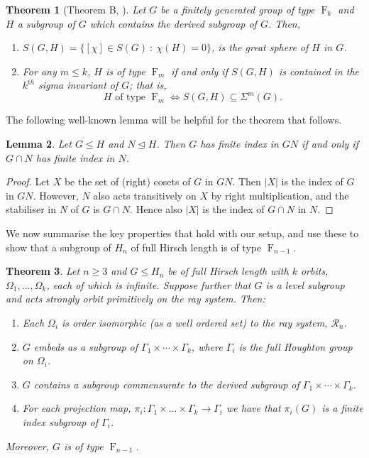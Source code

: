 \documentclass[11pt,a4paper]{amsart}
\newtheorem{theorem}{Theorem}[section]
\newtheorem{lemma}[theorem]{Lemma}
\theoremstyle{definition}
\theoremstyle{remark}
\newcommand{\Ra}{\mathcal{R}}
\newcommand{\FFF}{\operatorname{F}}
\begin{document}
\begin{theorem}[Theorem B, \cite{BNSdefinitions}]
\label{thm:BNS}	 Let $G$ be a finitely generated group of type $\FFF_k$ and $H$ a subgroup of $G$ which contains the derived subgroup of $G$. Then, 
\begin{enumerate}
	\item $S(G,H) = \{ [\chi] \in S(G) \ : \ \chi(H) = 0 \}$, is the great sphere of $H$ in $G$.
	\item For any $m \leq k$, $H$ is of type $\FFF_m$ if and only if $S(G,H)$ is contained in the $k^{th}$ sigma invariant of $G$; that is,
	$$
	H \text{ of type } \FFF_m \iff S(G,H) \subseteq \Sigma^m(G).
	$$
\end{enumerate}
\end{theorem}
The following well-known lemma will be helpful for the theorem that follows.
\begin{lemma}\label{lem:indexresult} Let $G\le H$ and $N\unlhd H$. Then $G$ has finite index in $GN$ if and only if $G\cap N$ has finite index in $N$.
\end{lemma}
\begin{proof} Let $X$ be the set of (right) cosets of $G$ in $GN$. Then $|X|$ is the index of $G$ in $GN$. However, $N$ also acts transitively on $X$ by right multiplication, and the stabiliser in $N$ of $G$ is $G \cap N$. Hence also $|X|$ is the index of $G \cap N$ in $N$.
\end{proof}
We now summarise the key properties that hold with our setup, and use these to show that a subgroup of $H_n$ of full Hirsch length is of type $\FFF_{n-1}$.
\begin{theorem}
	Let $n \geq 3$ and $G\le H_n$ be of full Hirsch length with $k$ orbits, $\Omega_1, \ldots, \Omega_k$, each of which is infinite. Suppose further that $G$ is a level subgroup and acts strongly orbit primitively on the ray system. Then: 
	\begin{enumerate}
		\item Each $\Omega_i$ is order isomorphic (as a well ordered set) to the ray system, $\Ra_n$.
		\item $G$ embeds as a subgroup of $\Gamma_1 \times \cdots \times\Gamma_k$, where $\Gamma_i$ is the full Houghton group on $\Omega_i$. 
		\item $G$ contains a subgroup commensurate to the derived subgroup of  $\Gamma_1 \times \cdots\times \Gamma_k$.
		\item For each projection map, $\pi_i: \Gamma_1 \times \ldots\times \Gamma_k \to \Gamma_i$ we have that $\pi_i(G)$ is a finite index subgroup of $\Gamma_i$.
	\end{enumerate}
	
	Moreover, $G$ is of type $\FFF_{n-1}$. 
\end{theorem}
\end{document}
